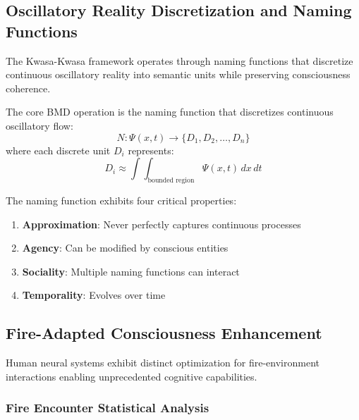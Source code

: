 \documentclass[11pt,a4paper]{article}
\begin{document}
\subsection{Oscillatory Reality Discretization and Naming Functions}

The Kwasa-Kwasa framework operates through naming functions that discretize continuous oscillatory reality into semantic units while preserving consciousness coherence.

\begin{definition}
The core BMD operation is the naming function that discretizes continuous oscillatory flow:
\begin{equation}
N: \Psi(x,t) \rightarrow \{D_1, D_2, \ldots, D_n\}
\end{equation}
where each discrete unit $D_i$ represents:
\begin{equation}
D_i \approx \int\int_{\text{bounded region}} \Psi(x,t) \, dx \, dt
\end{equation}
\end{definition}

The naming function exhibits four critical properties:
\begin{enumerate}
\item \textbf{Approximation}: Never perfectly captures continuous processes
\item \textbf{Agency}: Can be modified by conscious entities
\item \textbf{Sociality}: Multiple naming functions can interact
\item \textbf{Temporality}: Evolves over time
\end{enumerate}

\subsection{Fire-Adapted Consciousness Enhancement}

Human neural systems exhibit distinct optimization for fire-environment interactions enabling unprecedented cognitive capabilities.

\subsubsection{Fire Encounter Statistical Analysis}
\end{document}
